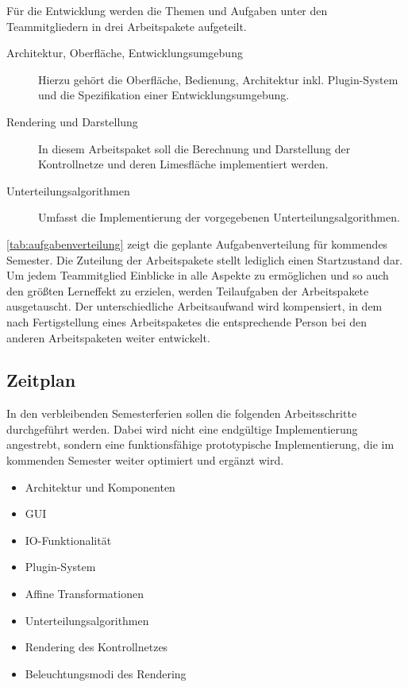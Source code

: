 Für die Entwicklung werden die Themen und Aufgaben unter den Teammitgliedern in drei Arbeitspakete aufgeteilt.

\begin{description}
\item[Architektur, Oberfläche, Entwicklungsumgebung] Hierzu gehört die Oberfläche, Bedienung, Architektur inkl. Plugin-System und die Spezifikation einer Entwicklungsumgebung.
\item[Rendering und Darstellung] In diesem Arbeitspaket soll die Berechnung und Darstellung der Kontrollnetze und deren Limesfläche implementiert werden.
\item[Unterteilungsalgorithmen] Umfasst die Implementierung der vorgegebenen Unterteilungsalgorithmen.
\end{description}

\autoref{tab:aufgabenverteilung} zeigt die geplante Aufgabenverteilung für kommendes Semester.
Die Zuteilung der Arbeitspakete stellt lediglich einen Startzustand dar. 
Um jedem Teammitglied Einblicke in alle Aspekte zu ermöglichen und so auch den größten Lerneffekt zu erzielen, werden Teilaufgaben der Arbeitspakete ausgetauscht.
Der unterschiedliche Arbeitsaufwand wird kompensiert, in dem nach Fertigstellung eines Arbeitspaketes die entsprechende Person bei den anderen Arbeitspaketen weiter entwickelt.

\subsection{Zeitplan}

In den verbleibenden Semesterferien sollen die folgenden Arbeitsschritte durchgeführt werden.
Dabei wird nicht eine endgültige Implementierung angestrebt, sondern eine funktionsfähige prototypische Implementierung, die im kommenden Semester weiter optimiert und ergänzt wird.

\begin{itemize}
\item Architektur und Komponenten
\item GUI
\item IO-Funktionalität
\item Plugin-System
\item Affine Transformationen
\item Unterteilungsalgorithmen
\item Rendering des Kontrollnetzes
\item Beleuchtungsmodi des Rendering
\end{itemize}


